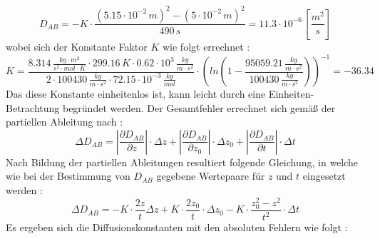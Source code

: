 \begin{equation}
D_{AB} = -K \cdot \frac{(5.15\cdot 10^{-2} \,\si{m})^2-(5\cdot 10^{-2} \,\si{m})^2}{490\,\si{s}} = 11.3 \cdot 10^{-6} \,[\si{\frac{m^2}{s}}]
\end{equation}
wobei sich der Konstante Faktor $K$ wie folgt errechnet : 
\begin{equation}
K = \frac{8.314 \,\si{\frac{kg\cdot m^2}{s^2 \cdot  mol \cdot K}}\cdot 299.16\,\si{K} \cdot 0.62\cdot 10^3\, \si{\frac{kg}{m\cdot s^2}}}{2\cdot  100430\,\si{\frac{kg}{m\cdot s^2}}\cdot 72.15\cdot 10^{-3}\,\si{\frac{kg}{mol}}}\cdot \left(ln\left(1-\frac{95059.21\,\si{\frac{kg}{m \cdot s^2}}}{100430\,\si{\frac{kg}{m\cdot s^2}}}\right)\right) ^{-1} = -36.34 
\end{equation}
Das diese Konstante einheitenlos ist, kann leicht durch eine Einheiten-Betrachtung begründet werden. Der Gesamtfehler errechnet sich gemäß der partiellen Ableitung nach : 
\begin{equation}
\Delta D_{AB} = \left| \frac{\partial D_{AB}}{\partial z}\right|\cdot \Delta z + \left| \frac{\partial D_{AB}}{\partial z_0}\right|\cdot \Delta z_0 + \left| \frac{\partial D_{AB}}{\partial t}\right|\cdot \Delta t
\end{equation}
Nach Bildung der partiellen Ableitungen resultiert folgende Gleichung, in welche wie bei der Bestimmung von $D_{AB}$ gegebene Wertepaare für $z$ und $t$ eingesetzt werden : 
\begin{equation}
\Delta D_{AB} = -K \cdot \frac{2z}{t} \Delta z + K \cdot \frac{2z_0}{t}\cdot \Delta z_0 -K \cdot \frac{z_0^2-z^2}{t^2}\cdot \Delta t
\end{equation}
Es ergeben sich die Diffusionskonstanten mit den absoluten Fehlern wie folgt : 
